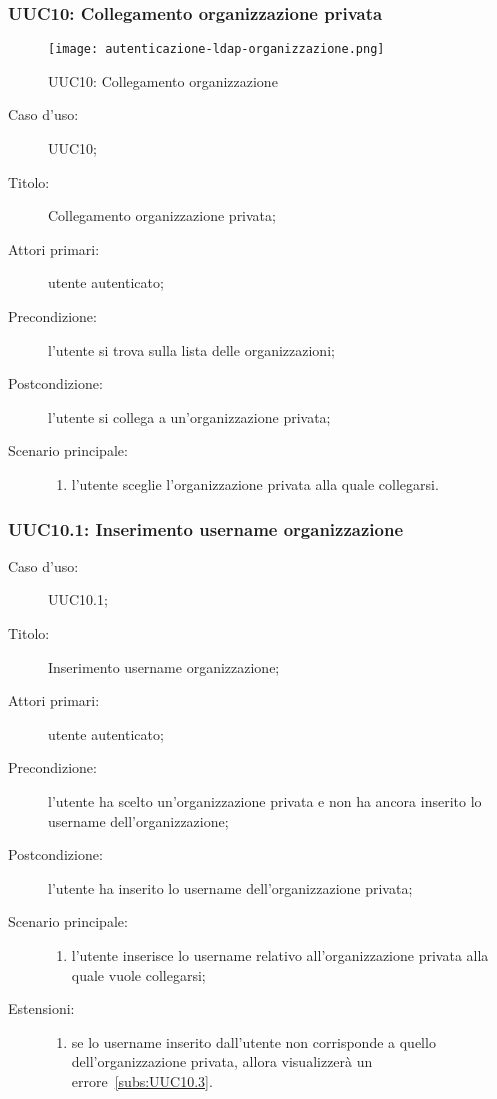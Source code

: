 \documentclass[../../../analisi-dei-requisiti.tex]{subfiles}
\begin{document}
\subsubsection{UUC10: Collegamento organizzazione privata}%
\label{subs:UUC10}

\begin{figure}[H]
  \centering
  \texttt{[image: autenticazione-ldap-organizzazione.png]}
  \caption{UUC10: Collegamento organizzazione }%
  \label{fig:UUC10}
\end{figure}

\begin{description}
  \item[Caso d’uso:] UUC10;
  \item[Titolo:] Collegamento organizzazione privata;
  \item[Attori primari:] utente autenticato;
  \item[Precondizione:] l'utente si trova sulla lista delle organizzazioni;
  \item[Postcondizione:] l'utente si collega a un'organizzazione privata;
  \item[Scenario principale:]
        \begin{enumerate}
          \item l'utente sceglie l'organizzazione privata alla quale collegarsi.
        \end{enumerate}
\end{description}

\subsubsection{UUC10.1: Inserimento username organizzazione}%
\label{subs:UUC10.1}
\begin{description}
  \item[Caso d’uso:] UUC10.1;
  \item[Titolo:] Inserimento username organizzazione;
  \item[Attori primari:] utente autenticato;
  \item[Precondizione:] l'utente ha scelto un'organizzazione privata e non ha ancora inserito lo username dell'organizzazione;
  \item[Postcondizione:] l'utente ha inserito lo username dell'organizzazione privata;
  \item[Scenario principale:]
        \begin{enumerate}
          \item l'utente inserisce lo username relativo all'organizzazione privata alla quale vuole collegarsi;
        \end{enumerate}
  \item[Estensioni:]
        \begin{enumerate}
          \item se lo username inserito dall'utente non corrisponde a quello dell'organizzazione privata, allora visualizzerà un errore~\ref{subs:UUC10.3}.
        \end{enumerate}
\end{description}
\end{document}
